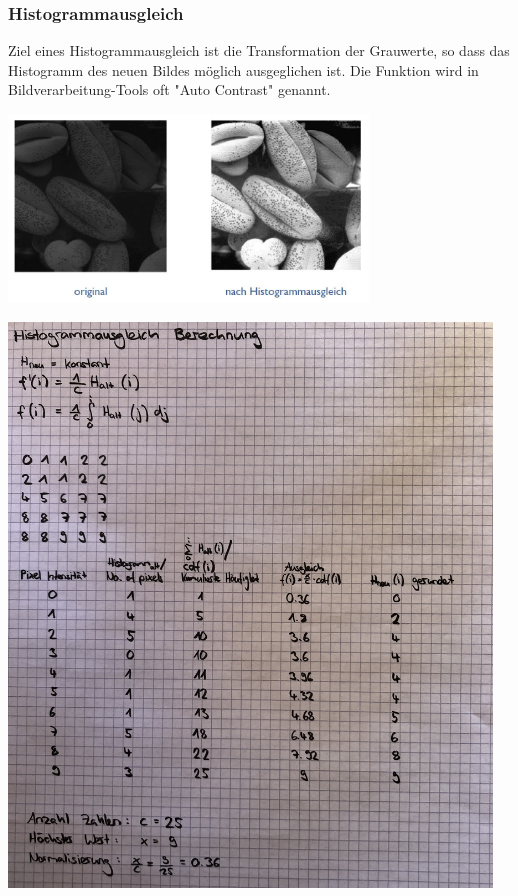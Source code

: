 \subsubsection{Histogrammausgleich}
Ziel eines Histogrammausgleich ist die Transformation der Grauwerte, so dass das Histogramm des neuen Bildes möglich ausgeglichen ist. Die Funktion wird in Bildverarbeitung-Tools oft "Auto Contrast" genannt.
\begin{center}
	\includegraphics[height=5cm,keepaspectratio]{images/sw01/BspHistogrammausgleich.JPG}
\end{center}

\begin{center}
	\includegraphics[height=15cm,keepaspectratio]{images/sw01/HistogrammAusgleichBerechnung.JPG}
\end{center}

